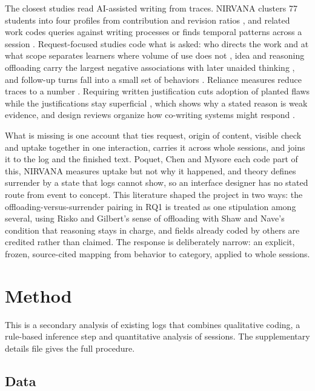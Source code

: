 \documentclass[manuscript,screen]{acmart}
\begin{document}
The closest studies read AI-assisted writing from traces. NIRVANA clusters 77 students into four profiles from contribution and revision ratios \cite{jelson2026nirvana}, and related work codes queries against writing processes \cite{jelson2026chi} or finds temporal patterns across a session \cite{yang2025}. Request-focused studies code what is asked: who directs the work and at what scope separates learners where volume of use does not \cite{poquet2026}, idea and reasoning offloading carry the largest negative associations with later unaided thinking \cite{chen2026}, and follow-up turns fall into a small set of behaviors \cite{mysore2025}. Reliance measures reduce traces to a number \cite{welzel2026,padmakumar2026,davalos2026}. Requiring written justification cuts adoption of planted flaws while the justifications stay superficial \cite{tao2026}, which shows why a stated reason is weak evidence, and design reviews organize how co-writing systems might respond \cite{reza2025}.

What is missing is one account that ties request, origin of content, visible check and uptake together in one interaction, carries it across whole sessions, and joins it to the log and the finished text. Poquet, Chen and Mysore each code part of this, NIRVANA measures uptake but not why it happened, and theory defines surrender by a state that logs cannot show, so an interface designer has no stated route from event to concept. This literature shaped the project in two ways: the offloading-versus-surrender pairing in RQ1 is treated as one stipulation among several, using Risko and Gilbert's sense of offloading with Shaw and Nave's condition that reasoning stays in charge, and fields already coded by others are credited rather than claimed. The response is deliberately narrow: an explicit, frozen, source-cited mapping from behavior to category, applied to whole sessions.

\section{Method}
\label{sec:method}

This is a secondary analysis of existing logs that combines qualitative coding, a rule-based inference step and quantitative analysis of sessions. The supplementary details file gives the full procedure.

\subsection{Data}
\label{sec:data}
\end{document}
